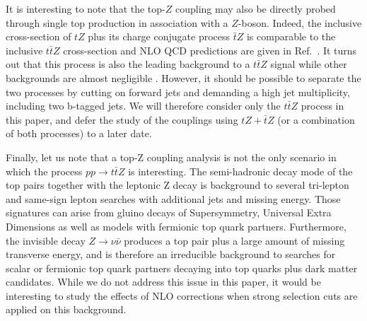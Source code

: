 \documentclass[preprint]{JHEP3} %
\def\ttbZ{t\bar{t}Z}
\begin{document}
It is interesting to note that the top-$Z$ coupling may also be directly probed through single top production in association with a $Z$-boson. 
Indeed, the inclusive cross-section of $tZ$ plus its charge conjugate process $\bar{t}Z$ is comparable to the inclusive $\ttbZ$ cross-section 
and NLO QCD predictions are given in Ref.~\cite{Campbell:2013yla}. 
It turns out that this process is also the leading background to a $\ttbZ$ signal while other backgrounds are almost negligible \cite{Baur:2004uw}.
However, it should be possible to separate the two processes by cutting on forward jets and demanding a high jet multiplicity, including two b-tagged jets. 
We will therefore consider only the $\ttbZ$ process in this paper, and defer the study of the couplings using $tZ+\bar{t}Z$ (or a combination of both processes) to a later date. 



Finally, let us note that a top-Z coupling analysis is not the only scenario in which the process $pp\to\ttbZ$ is interesting. 
The semi-hadronic decay mode of the top pairs together with the leptonic Z decay is background to several tri-lepton and same-sign lepton searches with additional jets and missing energy.
Those signatures can arise from gluino decays of Supersymmetry, Universal Extra Dimensions as well as models with fermionic top quark partners. 
Furthermore, the invisible decay $Z \to \nu \bar{\nu}$ produces a top pair plus a large amount of missing transverse energy, and is therefore an irreducible background 
to searches for scalar or fermionic top quark partners decaying into top quarks plus dark matter candidates.
While we do not address this issue in this paper, it would be interesting to study the effects of NLO corrections when strong selection cuts are applied on this background.
\end{document}
